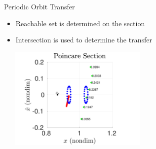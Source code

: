 \begin{frame}{Periodic Orbit Transfer}
    \begin{itemize}
        \item Reachable set is determined on the \Poincare section
        \item Intersection is used to determine the transfer
    \end{itemize}
    \pause
    \begin{center}
        ~
        ~
        \includegraphics[width=0.5\textwidth]{figures/2017_JAS/poincare_compare} 
    \end{center}
\end{frame}

